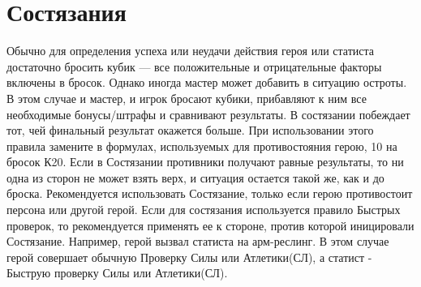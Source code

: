 \section{Состязания}
Обычно для определения успеха или неудачи действия героя или статиста достаточно бросить кубик — все положительные и отрицательные факторы включены в бросок. Однако иногда мастер может добавить в ситуацию остроты. В этом случае и мастер, и игрок бросают кубики, прибавляют к ним все необходимые бонусы/штрафы и сравнивают результаты. В состязании побеждает тот, чей финальный результат окажется больше. При использовании этого правила замените в формулах, используемых для противостояния герою, 10 на бросок К20.
\newline
Если в Состязании противники получают равные результаты, то ни одна из сторон не может взять верх, и ситуация остается такой же, как и до броска. Рекомендуется использовать Состязание, только если герою противостоит персона или другой герой.
\newline
Если для состязания используется правило Быстрых проверок, то рекомендуется применять ее к стороне, против которой иницировали Состязание. Например, герой вызвал статиста на арм-реслинг. В этом случае герой совершает обычную Проверку Силы или Атлетики(СЛ), а статист - Быструю проверку Силы или Атлетики(СЛ).